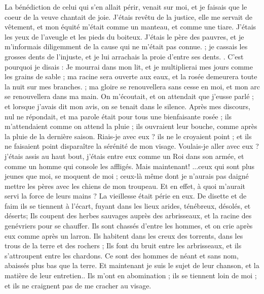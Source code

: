 \begin{multicols}{2}
{La bénédiction de celui qui s'en allait périr, venait sur moi, et je faisais que le coeur de la veuve chantait de joie.
J'étais revêtu de la justice, elle me servait de vêtement, et mon équité m'était comme un manteau, et comme une tiare.
J'étais les yeux de l'aveugle et les pieds du boiteux.
J'étais le père des pauvres, et je m'informais diligemment de la cause qui ne m'était pas connue. ;
je cassais les grosses dents de l'injuste, et je lui arrachais la proie d'entre ses dents. .
C'est pourquoi je disais : Je mourrai dans mon  lit, et je multiplierai mes jours comme les grains de sable ;
ma racine sera ouverte aux eaux, et la rosée demeurera toute la nuit sur mes branches. ;
ma gloire se renouvellera sans cesse en moi, et mon arc se renouvellera dans ma main.
On m'écoutait, et on attendait que j'eusse parlé ; et lorsque j'avais dit mon avis, on se tenait dans le silence.
Après mes discours, nul ne répondait, et ma parole était pour tous une bienfaisante rosée ;
ils m'attendaient comme on attend la pluie ; ils ouvraient leur bouche, comme après la pluie de la dernière saison.
Riais-je avec eux ? ils ne le croyaient point ; et ils ne faisaient point disparaître la sérénité de mon visage.
Voulais-je aller avec eux ? j'étais assis au haut bout, j'étais entre eux comme un Roi dans son armée, et comme un homme qui console les affligés.
\VerseOne{}Mais maintenant! ...ceux qui sont plus jeunes que moi, se moquent de moi ; ceux-là même dont je n'aurais pas daigné mettre les pères avec les chiens de mon troupeau.
Et en effet, à quoi m'aurait servi la force de leurs mains ? La vieillesse était périe en eux. 
De disette et de faim ils se tiennent à l'écart, fuyant dans les lieux arides, ténébreux, désolés, et déserts;
Ils coupent des herbes sauvages auprès des arbrisseaux, et la racine des genévriers pour se chauffer. 
Ils sont chassés d'entre les hommes, et on crie après eux comme après un larron. 
Ils habitent dans les creux des torrents, dans les trous de la terre et des rochers ;
Ils font du bruit entre les arbrisseaux, et ils s'attroupent entre les chardons. 
Ce sont des hommes de néant et sans nom, abaissés plus bas que la terre. 
Et maintenant je suis le sujet de leur chanson, et la matière de leur entretien..
Ils m'ont en abomination ; ils se tiennent loin de moi ; et ils ne craignent pas de me cracher au visage. 
}
\end{multicols}
